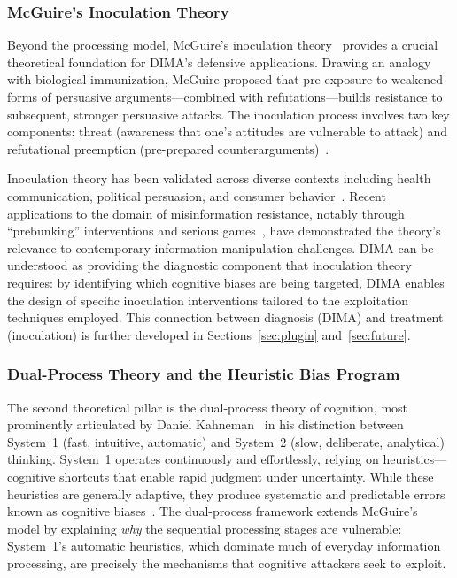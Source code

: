 \documentclass[11pt,a4paper]{article}
\begin{document}
\subsubsection{McGuire's Inoculation Theory}

Beyond the processing model, McGuire's inoculation theory~\cite{mcguire1961, mcguire1964} provides a crucial theoretical foundation for DIMA's defensive applications. Drawing an analogy with biological immunization, McGuire proposed that pre-exposure to weakened forms of persuasive arguments---combined with refutations---builds resistance to subsequent, stronger persuasive attacks. The inoculation process involves two key components: threat (awareness that one's attitudes are vulnerable to attack) and refutational preemption (pre-prepared counterarguments)~\cite{mcguire1964, pfau1988}.

Inoculation theory has been validated across diverse contexts including health communication, political persuasion, and consumer behavior~\cite{compton2013}. Recent applications to the domain of misinformation resistance, notably through ``prebunking'' interventions and serious games~\cite{roozenbeek2019, basol2020}, have demonstrated the theory's relevance to contemporary information manipulation challenges. DIMA can be understood as providing the diagnostic component that inoculation theory requires: by identifying which cognitive biases are being targeted, DIMA enables the design of specific inoculation interventions tailored to the exploitation techniques employed. This connection between diagnosis (DIMA) and treatment (inoculation) is further developed in Sections~\ref{sec:plugin} and~\ref{sec:future}.

\subsubsection{Dual-Process Theory and the Heuristic Bias Program}

The second theoretical pillar is the dual-process theory of cognition, most prominently articulated by Daniel Kahneman~\cite{kahneman2011} in his distinction between System~1 (fast, intuitive, automatic) and System~2 (slow, deliberate, analytical) thinking. System~1 operates continuously and effortlessly, relying on heuristics---cognitive shortcuts that enable rapid judgment under uncertainty. While these heuristics are generally adaptive, they produce systematic and predictable errors known as cognitive biases~\cite{gigerenzer2011}. The dual-process framework extends McGuire's model by explaining \textit{why} the sequential processing stages are vulnerable: System~1's automatic heuristics, which dominate much of everyday information processing, are precisely the mechanisms that cognitive attackers seek to exploit.
\end{document}
